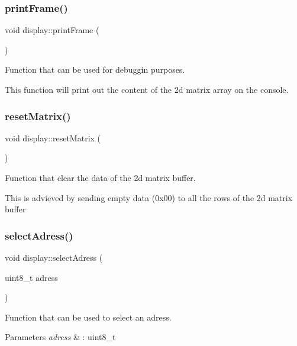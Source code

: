 \subsubsection{\texorpdfstring{print\+Frame()}{printFrame()}}
{\footnotesize\ttfamily void display\+::print\+Frame (\begin{DoxyParamCaption}{ }\end{DoxyParamCaption})}



Function that can be used for debuggin purposes. 

This function will print out the content of the 2d matrix array on the console. \mbox{\label{classdisplay_a48631fda3500f5550203ddd15e0d539b}} 
\subsubsection{\texorpdfstring{reset\+Matrix()}{resetMatrix()}}
{\footnotesize\ttfamily void display\+::reset\+Matrix (\begin{DoxyParamCaption}{ }\end{DoxyParamCaption})}



Function that clear the data of the 2d matrix buffer. 

This is advieved by sending empty data (0x00) to all the rows of the 2d matrix buffer \mbox{\label{classdisplay_afa66bcce0d701ae771b733bf0d3f9caf}} 
\subsubsection{\texorpdfstring{select\+Adress()}{selectAdress()}}
{\footnotesize\ttfamily void display\+::select\+Adress (\begin{DoxyParamCaption}\item[{uint8\+\_\+t}]{adress }\end{DoxyParamCaption})}



Function that can be used to select an adress. 


\begin{DoxyParams}{Parameters}
{\em adress} & \+: uint8\+\_\+t \\
\hline
\end{DoxyParams}
\mbox{\label{classdisplay_a261f1f8f23a0e7d341df5104de842e8e}} 
